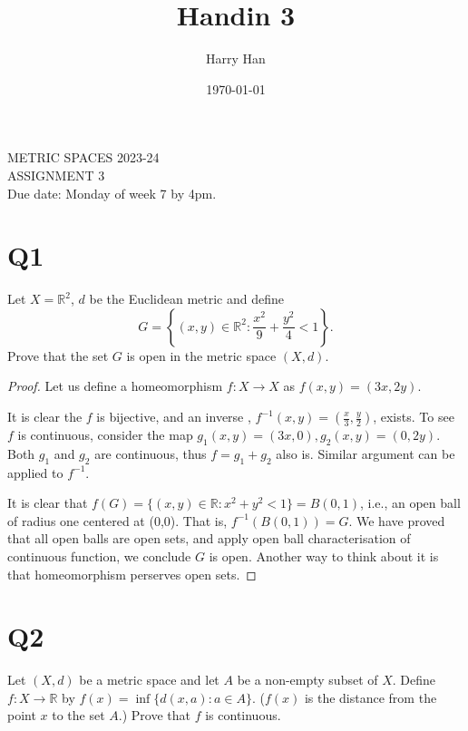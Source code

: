 \documentclass[12pt, a4paper]{article}
\title{Handin 3}
\author{Harry Han}
\date{\today}
\theoremstyle{definition}
\theoremstyle{remark}
\newcommand{\bb}[1]{\mathbb{#1}}
\begin{document}
\begin{center}
	METRIC SPACES 2023-24\\
	ASSIGNMENT 3\\
	Due date: Monday of week 7 by 4pm.
\end{center}

\bigskip

\section{Q1}

Let $X=\mathbb{R}^2$, $d$ be the Euclidean metric and define
\[
	G=\left\{(x,y)\in \mathbb{R}^2 : \frac{x^2}{9} + \frac{y^2}{4}<1\right\}.
\]
Prove that the set $G$ is open  in the metric space $(X,d)$.

\begin{proof}
	Let us define a homeomorphism $f: X \rightarrow X$ as $f(x,y) = (3x, 2y)$.

	It is clear the $f$ is bijective, and an inverse , $f^{-1}(x,y) = (\frac{x}{3}, \frac{y}{2})$, exists.
	To see $f$ is continuous, consider the map $g_1(x,y) = (3x, 0), g_2(x,y) = (0,2y)$. Both $g_1$ and $g_2$ are continuous, thus $f = g_1 + g_2 $ also is. Similar argument can be applied to $f^{-1}$.

	It is clear that $f(G) = \{(x,y) \in \bb{R} : x^2 + y^2 < 1 \} = B(0, 1)$, i.e., an open ball of radius one centered at (0,0). That is, $f^{-1}(B(0,1)) = G$. We have proved that all open balls are open sets, and apply open ball characterisation of continuous function, we conclude $G$ is open. Another way to think about it is that homeomorphism perserves open sets.
\end{proof}

\newpage

\section{Q2}

Let $(X,d)$ be a metric space and let $A$ be a non-empty subset of $X$.
Define $f:X\to\mathbb{R}$ by $f(x)=\inf\{d(x,a) : a \in A\}$. ($f(x)$ is the distance from the point $x$ to the set $A$.) Prove that $f$ is continuous.
\end{document}

